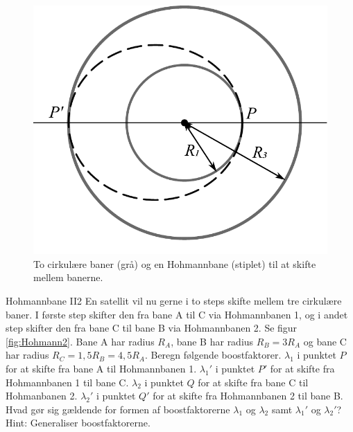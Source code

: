 \begin{figure}[h!]
	\centering
	\includegraphics[width=\columnwidth]{Planetbevaegelse/Hohmann.pdf}
	\caption{To cirkulære baner (grå) og en Hohmannbane (stiplet) til at skifte mellem banerne.}
	\label{fig:Hohmann}
\end{figure}
%
%
\begin{opgave}{Hohmannbane II}{2}
En satellit vil nu gerne i to steps skifte mellem tre cirkulære baner. I første step skifter den fra bane A til C via Hohmannbanen 1, og i andet step skifter den fra bane C til bane B via Hohmannbanen 2. Se figur \ref{fig:Hohmann2}. Bane A har radius $R_A$, bane B har radius $R_B = 3R_A$ og bane C har radius $R_C = 1,5 R_B = 4,5 R_A$. Beregn følgende boostfaktorer.
%
\opg $\lambda_1$ i punktet $P$ for at skifte fra bane A til Hohmannbanen 1.
\opg $\lambda_1'$ i punktet $P'$ for at skifte fra Hohmannbanen 1 til bane C.
\opg $\lambda_2$ i punktet $Q$ for at skifte fra bane C til Hohmanbanen 2.
\opg $\lambda_2'$ i punktet $Q'$ for at skifte fra Hohmannbanen 2 til bane B.
%
\opg Hvad gør sig gældende for formen af boostfaktorerne $\lambda_1$ og $\lambda_2$ samt $\lambda_1'$ og $\lambda_2'$?\\
Hint: Generaliser boostfaktorerne.
\end{opgave}
%
